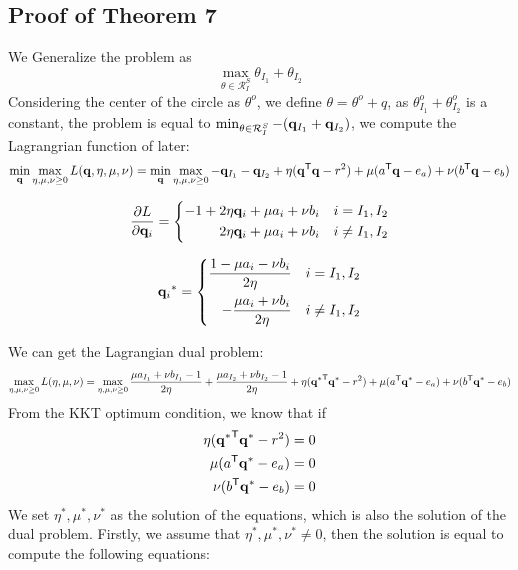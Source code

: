 \subsection{Proof of Theorem 7}
We Generalize the problem as 
\begin{equation}
\max_{\theta \in \mathcal{R}^{S}_{I}}{ \theta_{I_1} +\theta_{I_2} }
\end{equation}
Considering the center of the circle as $\theta^o$, we define $\theta = \theta^{o} + q$, as ${ \theta^{o}_{I_1} +\theta^{o}_{I_2} }$ is a constant, the problem is equal to $\min_{\theta \in \mathcal{R}^{S}_{I}}{- ( \mathbf q_{I_1} +\mathbf q_{I_2} )}$, we compute the Lagrangrian function of later:
\begin{equation}
\min_{\mathbf q} \max_{\eta,\mu,\nu \geq 0} L(\mathbf q,\eta,\mu,\nu) =\min_{\mathbf q}\max_{\eta,\mu,\nu\geq0} - {\mathbf q_{I_1} - \mathbf q_{I_2} + \eta( \mathbf q^{\mathsf T}\mathbf q - r^2)+\mu( a^{\mathsf T}\mathbf q - e_a ) + \nu( b^{\mathsf T}\mathbf q - e_b )}
\end{equation}

 \begin{equation}
\begin{split} 
\frac{\partial L}{\partial \mathbf q_i} = \left\{
\begin{aligned}
-1 + 2\eta \mathbf q_i +\mu a_i + \nu b_i \quad& i = I_1, I_2\\
 2\eta \mathbf q_i +\mu a_i + \nu b_i \quad& i \neq I_1, I_2
\end{aligned}
\right.
 \end{split}
\label{eq:lang1}
\end{equation}

 \begin{equation}
\begin{split} 
{\mathbf q_i}^{*} = \left\{
\begin{aligned}
\frac{1- \mu a_i - \nu b_i}{2\eta} \quad& i = I_1, I_2\\
-\frac{\mu a_i + \nu b_i}{2\eta} \quad& i \neq I_1, I_2
\end{aligned}
\right.
 \end{split}
\label{eq:lang1}
\end{equation}

We can get the Lagrangian dual problem:
\begin{equation}
\max_{\eta,\mu,\nu\geq0} L(\eta,\mu,\nu) = \max_{\eta,\mu,\nu\geq0} \frac{\mu a_{I_1} + \nu b_{I_1}-1}{2\eta} +\frac{\mu a_{I_2} + \nu b_{I_2}-1}{2\eta}+ \eta({\mathbf q^{*}}^{\mathsf T}\mathbf q^{*}-r^2 )+\mu( a^{\mathsf T}\mathbf q^{*} - e_a ) + \nu( b^{\mathsf T}\mathbf q^{*} - e_b )
\end{equation}
From the KKT optimum condition, we know that if
\begin{equation}
\begin{split} 
 \eta ({\mathbf q^{*}}^{\mathsf T}\mathbf q^{*} -r^2) &= 0\\
 \mu( a^{\mathsf T}\mathbf q^{*} - e_a)&= 0\\
 \nu(b^{\mathsf T}\mathbf q^{*} - e_b) &=0
 \end{split}
\end{equation}
We set $\eta^{*}, \mu^{*}, \nu^{*}$ as the solution of the equations, which is also the solution of the dual problem. Firstly, we assume that $\eta^{*}, \mu^{*}, \nu^{*} \neq 0$, then the solution is equal to compute the following equations:


